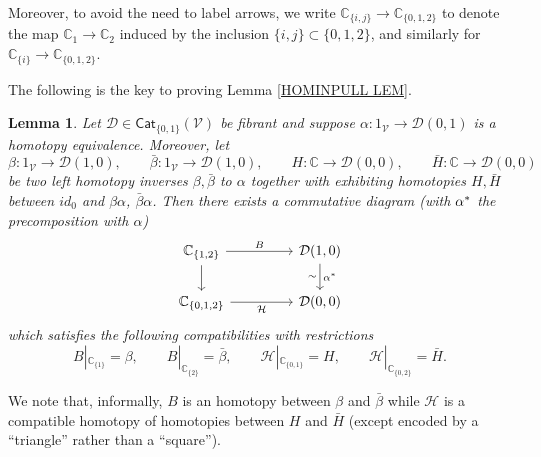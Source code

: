 \documentclass[a4paper,10pt
,draft
]{article}%
\numberwithin{equation}{section}
\numberwithin{figure}{section}
\newtheorem{lemma}[equation]{Lemma}%
\theoremstyle{definition} %
\newcommand{\V}{\ensuremath{\mathcal V}}
\newcommand{\1}{\ensuremath{\mathbbm 1}}%
\begin{document}
Moreover, to avoid the need to label arrows, 
we write
$\mathbb{C}_{\{i,j\}} \to \mathbb{C}_{\{0,1,2\}}$
to denote the map
$\mathbb{C}_{1} \to \mathbb{C}_{2}$
induced by the inclusion $\{i,j\} \subset \{0,1,2\}$,
and similarly for $\mathbb{C}_{\{i\}} \to \mathbb{C}_{\{0,1,2\}}$.

The following is the key to proving Lemma \ref{HOMINPULL LEM}.


\begin{lemma}\label{HOMTPOFHOMTP LEM}
Let $\mathcal{D} \in \mathsf{Cat}_{\{0,1\}}(\V)$
be fibrant and suppose 
$\alpha \colon 1_{\V} \to \mathcal{D}(0,1)$
is a homotopy equivalence. 
%
Moreover, let 
\[\beta \colon 1_{\V} \to \mathcal{D}(1,0), \qquad
\bar{\beta} \colon 1_{\V} \to \mathcal{D}(1,0),\qquad
H \colon \mathbb{C} \to \mathcal{D}(0,0), \qquad
\bar{H} \colon \mathbb{C} \to \mathcal{D}(0,0)
\]
be two left homotopy inverses $\beta,\bar{\beta}$ to $\alpha$
together with exhibiting homotopies 
$H,\bar{H}$
between $id_0$ and $\beta \alpha$, $\bar{\beta}\alpha$.
Then there exists a commutative diagram (with $\alpha^{\**}$ the precomposition with $\alpha$)
\begin{equation}
\begin{tikzcd}[column sep = 45pt]
	\mathbb{C}_{\{1,2\}}
	\ar{d}
	\arrow{r}{B}
&
	\mathcal{D}(1,0)
	\arrow{d}{\alpha^{\**}}[swap]{\sim}
\\
	\mathbb{C}_{\{0,1,2\}}
	\arrow{r}[swap]{\mathcal{H}}
&
	\mathcal{D}(0,0)
\end{tikzcd}
\end{equation}
which satisfies the following compatibilities with restrictions
\[
B|_{\mathbb{C}_{\{1\}}} = \beta, \qquad
B|_{\mathbb{C}_{\{2\}}} = \bar{\beta}, \qquad
\mathcal{H}|_{\mathbb{C}_{\{0,1\}}} = H, \qquad
\mathcal{H}|_{\mathbb{C}_{\{0,2\}}} = \bar{H}.
\]
\end{lemma}

We note that, informally, $B$ is an homotopy between $\beta$ and $\bar{\beta}$
while $\mathcal{H}$
is a compatible homotopy of homotopies 
between $H$ and $\bar{H}$
(except encoded by a ``triangle'' rather than a ``square'').
\end{document}
